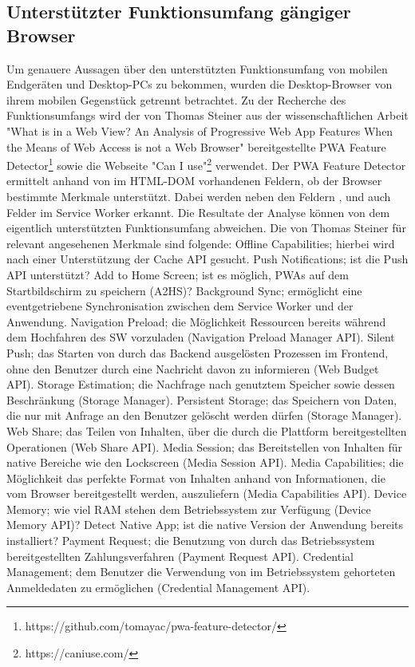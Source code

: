 \subsection{Unterstützter Funktionsumfang gängiger Browser}
\label{subsec:unterstuetzterfunktionsumfanggaengigerbrowser}
Um genauere Aussagen über den unterstützten Funktionsumfang von mobilen Endgeräten
und Desktop-PCs zu bekommen, wurden die Desktop-Browser von ihrem mobilen
Gegenstück getrennt betrachtet. Zu der Recherche des Funktionsumfangs wird
der von Thomas Steiner aus der wissenschaftlichen Arbeit "What is
in a Web View? An Analysis of Progressive Web App Features When the
Means of Web Access is not a Web Browser" bereitgestellte
PWA Feature Detector\footnote{https://github.com/tomayac/pwa-feature-detector/} sowie 
die Webseite "Can I use"\footnote{https://caniuse.com/} verwendet.
Der PWA Feature Detector ermittelt anhand von im HTML-DOM
vorhandenen Feldern, ob der Browser bestimmte Merkmale unterstützt.
Dabei werden neben den Feldern ,  und 
auch Felder im Service Worker erkannt. Die Resultate der Analyse können von dem
eigentlich unterstützten Funktionsumfang abweichen. Die von Thomas
Steiner für relevant angesehenen Merkmale sind folgende:
Offline Capabilities; hierbei wird nach
einer Unterstützung der Cache API gesucht. Push Notifications;
ist die Push API unterstützt? Add to Home Screen; ist es möglich, PWAs auf
dem Startbildschirm zu speichern (A2HS)? Background Sync; ermöglicht eine eventgetriebene Synchronisation
zwischen dem Service Worker und der Anwendung. Navigation Preload; die Möglichkeit
Ressourcen bereits während dem Hochfahren des SW vorzuladen
(Navigation Preload Manager API). Silent Push; das Starten von durch das
Backend ausgelösten Prozessen im Frontend, ohne den Benutzer
durch eine Nachricht davon zu informieren (Web Budget API).
Storage Estimation; die Nachfrage nach genutztem Speicher sowie
dessen Beschränkung (Storage Manager). Persistent Storage;
das Speichern von Daten, die nur mit Anfrage an den Benutzer gelöscht
werden dürfen (Storage Manager). Web Share; das Teilen von Inhalten,
über die durch die Plattform bereitgestellten Operationen (Web Share API).
Media Session; das Bereitstellen von Inhalten für native
Bereiche wie den Lockscreen (Media Session API). Media Capabilities;
die Möglichkeit das perfekte Format von Inhalten anhand von
Informationen, die vom Browser bereitgestellt werden, auszuliefern (Media Capabilities API).
Device Memory; wie viel RAM stehen dem Betriebssystem zur
Verfügung (Device Memory API)? Detect Native App; ist die native Version
der Anwendung bereits installiert? Payment Request;
die Benutzung von durch das Betriebssystem bereitgestellten
Zahlungsverfahren (Payment Request API). Credential Management;
dem Benutzer die Verwendung von im Betriebssystem gehorteten
Anmeldedaten zu ermöglichen (Credential Management API).\cite[Abschnitt 2.3]{WhatIsInAWebView}

